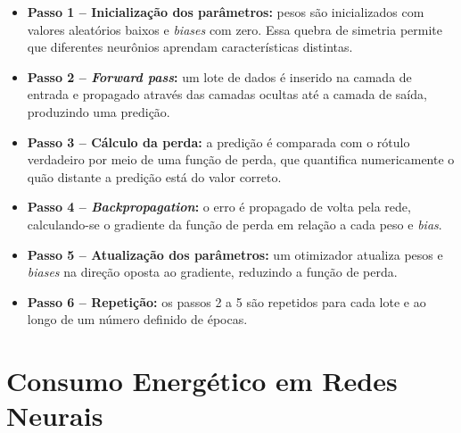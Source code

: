 \begin{itemize}
    \item \textbf{Passo 1 -- Inicialização dos parâmetros:} pesos são inicializados com valores aleatórios baixos e \textit{biases} com zero. Essa quebra de simetria permite que diferentes neurônios aprendam características distintas.
    \item \textbf{Passo 2 -- \textit{Forward pass}:} um lote de dados é inserido na camada de entrada e propagado através das camadas ocultas até a camada de saída, produzindo uma predição.
    \item \textbf{Passo 3 -- Cálculo da perda:} a predição é comparada com o rótulo verdadeiro por meio de uma função de perda, que quantifica numericamente o quão distante a predição está do valor correto.
    \item \textbf{Passo 4 -- \textit{Backpropagation}:} o erro é propagado de volta pela rede, calculando-se o gradiente da função de perda em relação a cada peso e \textit{bias}.
    \item \textbf{Passo 5 -- Atualização dos parâmetros:} um otimizador atualiza pesos e \textit{biases} na direção oposta ao gradiente, reduzindo a função de perda.
    \item \textbf{Passo 6 -- Repetição:} os passos 2 a 5 são repetidos para cada lote e ao longo de um número definido de épocas.
\end{itemize}

\section{Consumo Energético em Redes Neurais}\label{sec:consumo_energetico}

